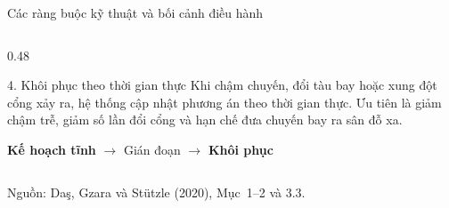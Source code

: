 \documentclass[aspectratio=169,10pt]{beamer}
\begin{document}
\begin{frame}[t]{Các ràng buộc kỹ thuật và bối cảnh điều hành}
\begin{columns}[T,onlytextwidth]
\begin{column}{0.48\textwidth}
\begin{exampleblock}{4. Khôi phục theo thời gian thực}
Khi chậm chuyến, đổi tàu bay hoặc xung đột cổng xảy ra, hệ thống cập
nhật phương án theo thời gian thực. Ưu tiên là giảm chậm trễ, giảm số
lần đổi cổng và hạn chế đưa chuyến bay ra sân đỗ xa.
\end{exampleblock}

\centering
\small
\textbf{Kế hoạch tĩnh} $\longrightarrow$ \alert{Gián đoạn} $\longrightarrow$
\textbf{Khôi phục}

\end{column}
\end{columns}

\vfill
\tiny Nguồn: Da\c{s}, Gzara và St\"utzle (2020), Mục~1--2 và 3.3.

\end{frame}
\end{document}
